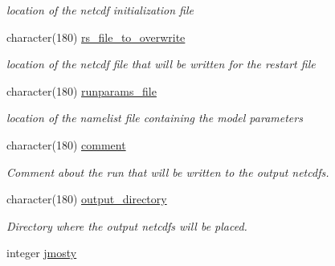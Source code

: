 \begin{DoxyCompactItemize}
\begin{DoxyCompactList}\small\item\em location of the netcdf initialization file \end{DoxyCompactList}\item 
\hypertarget{structctem__statevars_1_1ctem__switches_af6c69ec147c5d3fbaba62795c372345c}{}character(180) \hyperlink{structctem__statevars_1_1ctem__switches_af6c69ec147c5d3fbaba62795c372345c}{rs\+\_\+file\+\_\+to\+\_\+overwrite}\label{structctem__statevars_1_1ctem__switches_af6c69ec147c5d3fbaba62795c372345c}

\begin{DoxyCompactList}\small\item\em location of the netcdf file that will be written for the restart file \end{DoxyCompactList}\item 
\hypertarget{structctem__statevars_1_1ctem__switches_a1175e628e78e666119849c07665d233c}{}character(180) \hyperlink{structctem__statevars_1_1ctem__switches_a1175e628e78e666119849c07665d233c}{runparams\+\_\+file}\label{structctem__statevars_1_1ctem__switches_a1175e628e78e666119849c07665d233c}

\begin{DoxyCompactList}\small\item\em location of the namelist file containing the model parameters \end{DoxyCompactList}\item 
\hypertarget{structctem__statevars_1_1ctem__switches_a2007fabd7a297185a3d9e09b625160b1}{}character(180) \hyperlink{structctem__statevars_1_1ctem__switches_a2007fabd7a297185a3d9e09b625160b1}{comment}\label{structctem__statevars_1_1ctem__switches_a2007fabd7a297185a3d9e09b625160b1}

\begin{DoxyCompactList}\small\item\em Comment about the run that will be written to the output netcdfs. \end{DoxyCompactList}\item 
\hypertarget{structctem__statevars_1_1ctem__switches_aefbc0cdb81235ecbff7a36f7fb3f9dec}{}character(180) \hyperlink{structctem__statevars_1_1ctem__switches_aefbc0cdb81235ecbff7a36f7fb3f9dec}{output\+\_\+directory}\label{structctem__statevars_1_1ctem__switches_aefbc0cdb81235ecbff7a36f7fb3f9dec}

\begin{DoxyCompactList}\small\item\em Directory where the output netcdfs will be placed. \end{DoxyCompactList}\item 
\hypertarget{structctem__statevars_1_1ctem__switches_a305977873e5b6659caf406cb91b62a0b}{}integer \hyperlink{structctem__statevars_1_1ctem__switches_a305977873e5b6659caf406cb91b62a0b}{jmosty}\label{structctem__statevars_1_1ctem__switches_a305977873e5b6659caf406cb91b62a0b}


\end{DoxyCompactItemize}

